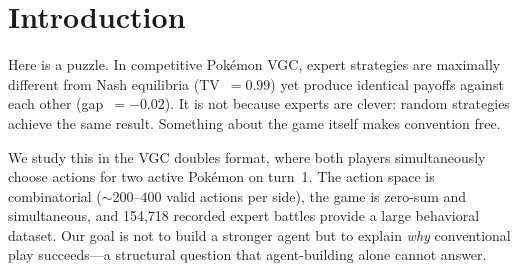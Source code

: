 \documentclass{article}
\begin{document}

\printAffiliationsAndNotice{}

\begin{abstract}
Expert Pok\'emon VGC strategies look nothing like Nash equilibria (total variation 0.99), yet expert-vs-expert outcomes match Nash payoffs within 0.02. This is not expert skill: random strategies achieve the same result. SVD of the ${\sim}200$-action payoff matrices reveals effective rank~3, with 93\% of strategic variation in the payoff null space. Switching from behavioral cloning to offline RL (Conservative Q-Learning) confirms that game structure, not learning objective, is the binding constraint: CQL reshapes 60\% of the distribution but gains only 17\% in exploitability. The one exception is terastallization---an irreversible resource where convention accounts for 30\% of total exploitability.
\end{abstract}

\section{Introduction}

Here is a puzzle. In competitive Pok\'emon VGC, expert strategies are maximally different from Nash equilibria (TV~$= 0.99$) yet produce identical payoffs against each other (gap~$= -0.02$). It is not because experts are clever: random strategies achieve the same result. Something about the game itself makes convention free.

We study this in the VGC doubles format, where both players simultaneously choose actions for two active Pok\'emon on turn~1. The action space is combinatorial (${\sim}200$--$400$ valid actions per side), the game is zero-sum and simultaneous, and 154,718 recorded expert battles provide a large behavioral dataset. Our goal is not to build a stronger agent but to explain \emph{why} conventional play succeeds---a structural question that agent-building alone cannot answer.
\end{document}
